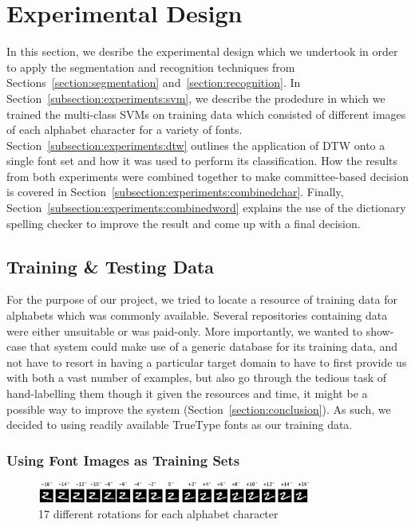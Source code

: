 \documentclass[12pt]{article}
\begin{document}
\section{Experimental Design}
\label{section:experiments}
In this section, we desribe the experimental design which we undertook in order to apply the segmentation and recognition techniques from Sections~\ref{section:segmentation} and~\ref{section:recognition}. In Section~\ref{subsection:experiments:svm}, we describe the prodedure in which we trained the multi-class SVMs on training data which consisted of different images of each alphabet character for a variety of fonts. Section~\ref{subsection:experiments:dtw} outlines the application of DTW onto a single font set and how it was used to perform its classification. How the results from both experiments were combined together to make committee-based decision is covered in Section~\ref{subsection:experiments:combinedchar}. Finally, Section~\ref{subsection:experiments:combinedword} explains the use of the dictionary spelling checker to improve the result and come up with a final decision.
	
	\subsection{Training \& Testing Data}
	For the purpose of our project, we tried to locate a resource of training data for alphabets which was commonly available. Several repositories containing data were either unsuitable or was paid-only. More importantly, we wanted to show-case that system could make use of a generic database for its training data, and not have to resort in having a particular target domain to have to first provide us with both a vast number of examples, but also go through the tedious task of hand-labelling them though it given the resources and time, it might be a possible way to improve the system (Section~\ref{section:conclusion}). As such, we decided to using readily available TrueType fonts as our training data.
			
		\subsubsection{Using Font Images as Training Sets}
		
		\begin{figure}[htbp!]
		\centering
		\includegraphics[width=0.8\textwidth]{training_data.eps}
		\caption{17 different rotations for each alphabet character}
		\label{figure:training_data}
		\end{figure}
		
\end{document}
